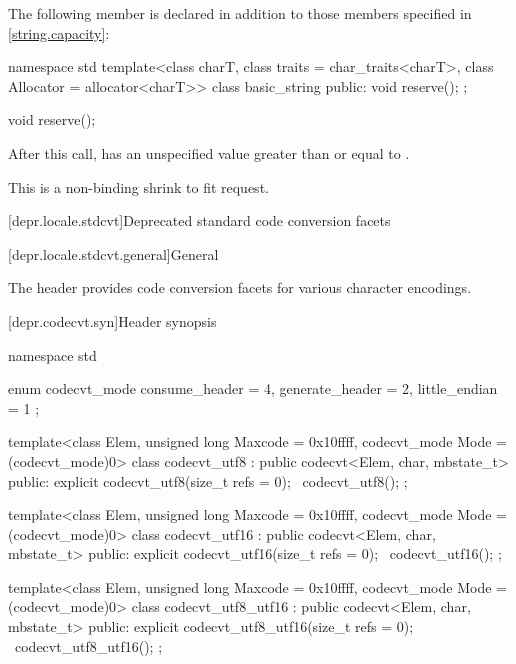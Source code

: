 \pnum
The following member is declared in addition to those members specified
in \ref{string.capacity}:
%
\begin{codeblock}
namespace std {
  template<class charT, class traits = char_traits<charT>,
           class Allocator = allocator<charT>>
  class basic_string {
  public:
    void reserve();
  };
}
\end{codeblock}

%
\begin{itemdecl}
void reserve();
\end{itemdecl}

\begin{itemdescr}
\pnum
\effects
After this call,  has an unspecified value
greater than or equal to .
\begin{note}
This is a non-binding shrink to fit request.
\end{note}
\end{itemdescr}

[depr.locale.stdcvt]{Deprecated standard code conversion facets}

[depr.locale.stdcvt.general]{General}

\pnum
The header  provides
code conversion facets for various character encodings.

[depr.codecvt.syn]{Header  synopsis}

%
%
%
%
\begin{codeblock}
namespace std {
  enum codecvt_mode {
    consume_header = 4,
    generate_header = 2,
    little_endian = 1
  };

  template<class Elem, unsigned long Maxcode = 0x10ffff, codecvt_mode Mode = (codecvt_mode)0>
    class codecvt_utf8 : public codecvt<Elem, char, mbstate_t> {
    public:
      explicit codecvt_utf8(size_t refs = 0);
      ~codecvt_utf8();
    };

  template<class Elem, unsigned long Maxcode = 0x10ffff, codecvt_mode Mode = (codecvt_mode)0>
    class codecvt_utf16 : public codecvt<Elem, char, mbstate_t> {
    public:
      explicit codecvt_utf16(size_t refs = 0);
      ~codecvt_utf16();
    };

  template<class Elem, unsigned long Maxcode = 0x10ffff, codecvt_mode Mode = (codecvt_mode)0>
    class codecvt_utf8_utf16 : public codecvt<Elem, char, mbstate_t> {
    public:
      explicit codecvt_utf8_utf16(size_t refs = 0);
      ~codecvt_utf8_utf16();
    };
}
\end{codeblock}

